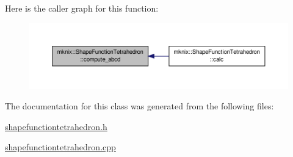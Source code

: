 Here is the caller graph for this function\-:\nopagebreak
\begin{figure}[H]
\begin{center}
\leavevmode
\includegraphics[width=350pt]{d8/dbd/classmknix_1_1_shape_function_tetrahedron_a0173ff8fc55470c6d46684cd28eeb345_icgraph}
\end{center}
\end{figure}




The documentation for this class was generated from the following files\-:\begin{DoxyCompactItemize}
\item 
\hyperlink{shapefunctiontetrahedron_8h}{shapefunctiontetrahedron.\-h}\item 
\hyperlink{shapefunctiontetrahedron_8cpp}{shapefunctiontetrahedron.\-cpp}\end{DoxyCompactItemize}
